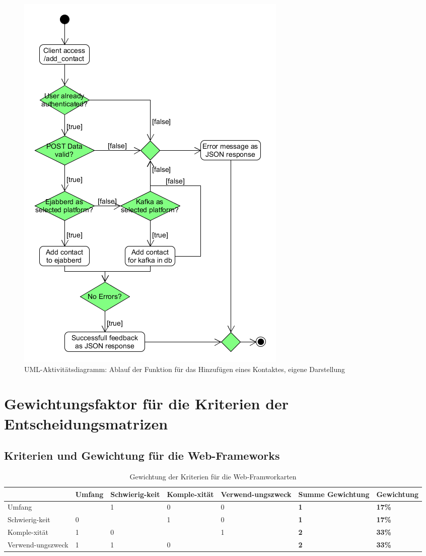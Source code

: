 \documentclass[a4paper,titlepage,halfparskip,12pt]{scrreprt}
\begin{document}
\begin{figure}[h]
	\centering
	\includegraphics[width=.7\textwidth]{images/umlAddContactStudienarbeit}
	\caption{\acs{UML}-Aktivitätsdiagramm: Ablauf der Funktion für das Hinzufügen eines Kontaktes, eigene Darstellung}
	\label{img:umlAddContactStudienarbeit}
\end{figure}

\pagebreak

\chapter{Gewichtungsfaktor für die Kriterien der Entscheidungsmatrizen}
\section{Kriterien und Gewichtung für die Web-Frameworks}
\renewcommand{\arraystretch}{2}
\begin{table}[h]
	\centering
	\caption{Gewichtung der Kriterien für die Web-Framworkarten}
	\begin{tabular}{p{}|p{}|p{}|p{}|p{}|p{}|p{}|}
		& Umfang & Schwierig-keit & Komple-xität & Verwend-ungszweck & \textbf{Summe Gewichtung} & \textbf{Gewichtung}\\
		\hline
		Umfang & \cellcolor{gray} & 1 & 0 & 0 & \textbf{1} & \textbf{17\%}\\
		\hline
		Schwierig-keit & 0 & \cellcolor{gray} & 1 & 0 & \textbf{1} & \textbf{17\%}\\
		\hline
		Komple-xität & 1 & 0 & \cellcolor{gray} & 1 & \textbf{2} & \textbf{33\%}\\
		\hline
		Verwend-ungszweck & 1 & 1 & 0 & \cellcolor{gray} & \textbf{2} & \textbf{33\%}\\
		\hline
	\end{tabular}
	\label{tab:GewichtungWebFramework}
\end{table}
\pagebreak
\end{document}
